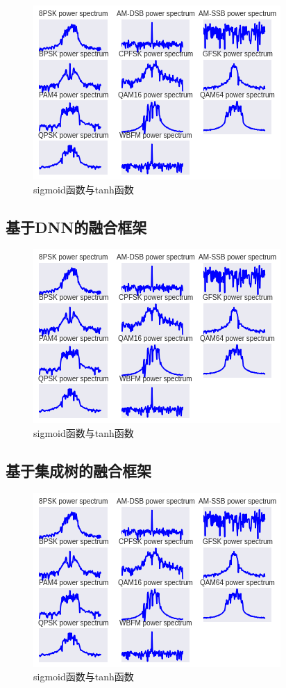 \begin{figure}[!h]
	\centering
	\includegraphics[scale=0.9]{figures/chapter_3/signal_view_2}
	\caption{sigmoid函数与tanh函数}\label{fig_2_2}
\end{figure}

\subsection{基于DNN的融合框架}

\begin{figure}[!h]
	\centering
	\includegraphics[scale=0.9]{figures/chapter_3/signal_view_2}
	\caption{sigmoid函数与tanh函数}\label{fig_2_2}
\end{figure}

\subsection{基于集成树的融合框架}

\begin{figure}[!h]
	\centering
	\includegraphics[scale=0.9]{figures/chapter_3/signal_view_2}
	\caption{sigmoid函数与tanh函数}\label{fig_2_2}
\end{figure}

